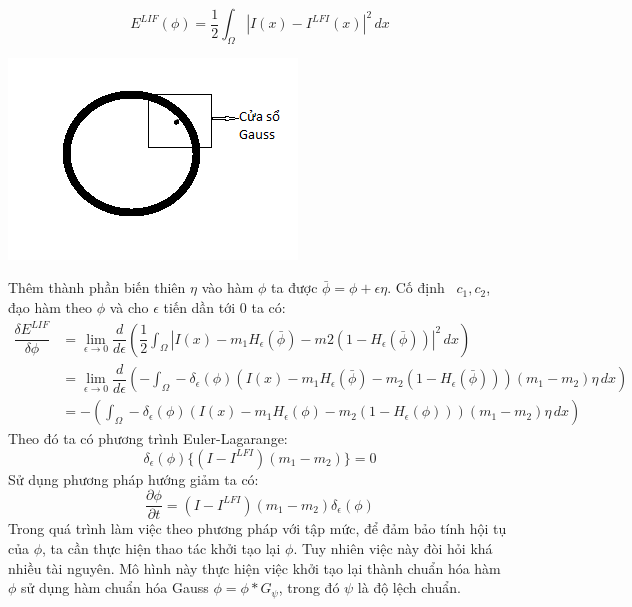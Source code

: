 \documentclass[12pt, oneside, a4paper]{book}
\begin{document}
\begin{equation*}
E^{LIF}(\phi)=\dfrac{1}{2}\int_{\Omega}|I(x)-I^{LFI}(x)|^2\,dx
\end{equation*}
\begin{center}
\includegraphics[]{figure/Gaussfilter.png}
\end{center}
Thêm thành phần biến thiên $\eta$ vào hàm $\phi$ ta được $\bar{\phi}=\phi+\epsilon \eta$. Cố định ~$c_1,c_2$, đạo hàm theo $\phi$ và cho $\epsilon$ tiến dần tới 0 ta có:
\begin{equation*}
\begin{split}
\dfrac{\delta E^{LIF}}{\delta \phi } &=\lim_{\epsilon \rightarrow 0}\dfrac{d}{d \epsilon}\left(\dfrac{1}{2}\int_{\Omega}|I(x)-m_1H_{\epsilon}(\bar{\phi})-m2\left(1-H_{\epsilon}\left(\bar{\phi}\right)\right)|^2\,dx\right) \\ 
&=\lim_{\epsilon \rightarrow 0}\dfrac{d}{d \epsilon}\left(-\int_{\Omega}-\delta_{\epsilon}\left(\phi\right)\left(I(x)-m_1H_{\epsilon}(\bar{\phi})-m_2\left(1-H_{\epsilon}(\bar{\phi})\right)\right)(m_1-m_2)\eta\,dx\right) \\ 
&=-\left(\int_{\Omega}-\delta_{\epsilon}(\phi)\left(I(x)-m_1 H_{\epsilon}\left(\phi\right)-m_2\left(1-H_{\epsilon}(\phi)\right)\right)(m_1-m_2)\eta\,dx\right)
\end{split}
\end{equation*}
Theo đó ta có phương trình Euler-Lagarange:
\begin{equation*}
\delta_{\epsilon}(\phi)\lbrace(I-I^{LFI})(m_1-m_2)\rbrace=0
\end{equation*}
Sử dụng phương pháp hướng giảm ta có:
\begin{equation*}
\dfrac{\partial \phi}{\partial t}=(I-I^{LFI})(m_1-m_2)\delta_{\epsilon}(\phi)
\end{equation*}
Trong quá trình làm việc theo phương pháp với tập mức, để đảm bảo tính hội tụ của $\phi$, ta cần thực hiện thao tác khởi tạo lại $\phi$. Tuy nhiên việc này đòi hỏi khá nhiều tài nguyên. Mô hình này thực hiện việc khởi tạo lại thành chuẩn hóa hàm $\phi$ sử dụng hàm chuẩn hóa Gauss $\phi=\phi* G_{\psi}$, trong đó $\psi$ là độ lệch chuẩn.
\end{document}
